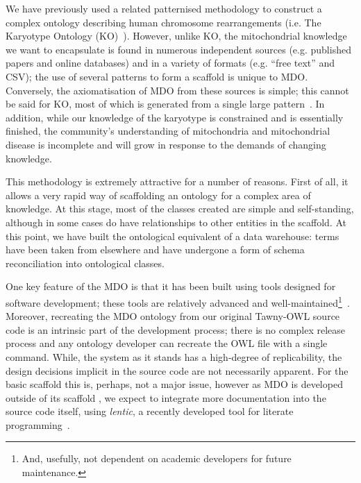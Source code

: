\documentclass{icbo}
\newcommand{\tawny}{Tawny-OWL\xspace}
\begin{document}
We have previously used a related patternised methodology to construct
a complex ontology describing human chromosome rearrangements
(i.e. The Karyotype Ontology
(KO)~\citep{warrender-karyotype}). However, unlike KO, the
mitochondrial knowledge we want to encapsulate is found in numerous
independent sources (e.g. published papers and online databases) and
in a variety of formats (e.g. ``free text'' and CSV); the use of
several patterns to form a scaffold is unique to MDO. Conversely, the
axiomatisation of MDO from these sources is simple; this cannot be
said for KO, most of which is generated from a single large
pattern~\citep{warrender-pattern}. In addition, while our knowledge of
the karyotype is constrained and is essentially finished, the
community's understanding of mitochondria and mitochondrial disease is
incomplete and will grow in response to the demands of changing
knowledge.

This methodology is extremely attractive for a number of
reasons. First of all, it allows a very rapid way of scaffolding an
ontology for a complex area of knowledge. At this stage, most of the
classes created are simple and self-standing, although in some cases
do have relationships to other entities in the scaffold. At this
point, we have built the ontological equivalent of a data warehouse:
terms have been taken from elsewhere and have undergone a form of
schema reconciliation into ontological classes.

One key feature of the MDO is that it has been built using tools
designed for software development; these tools are relatively advanced
and well-maintained\footnote{And, usefully, not dependent on academic
  developers for future maintenance.}~\citep{tawny}. Moreover,
recreating the MDO ontology from our original \tawny source code is an
intrinsic part of the development process; there is no complex release
process and any ontology developer can recreate the OWL file with a
single command. While, the system as it stands has a high-degree of
replicability, the design decisions implicit in the source code are
not necessarily apparent. For the basic scaffold this is, perhaps, not
a major issue, however as MDO is developed outside of its scaffold ,
we expect to integrate more documentation into the source code itself,
using \textit{lentic}, a recently developed tool for literate
programming~\citep{greycite23590}.
\end{document}

